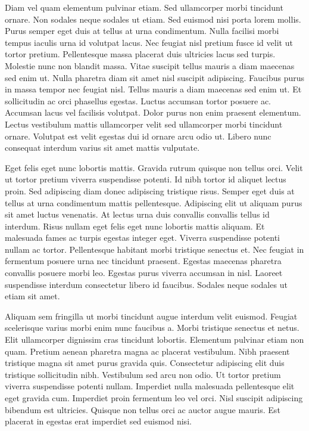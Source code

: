 \documentclass[11pt,a4paper]{article}
\begin{document}
Diam vel quam elementum pulvinar etiam. Sed ullamcorper morbi tincidunt ornare. Non sodales neque sodales ut etiam. Sed euismod nisi porta lorem mollis. Purus semper eget duis at tellus at urna condimentum. Nulla facilisi morbi tempus iaculis urna id volutpat lacus. Nec feugiat nisl pretium fusce id velit ut tortor pretium. Pellentesque massa placerat duis ultricies lacus sed turpis. Molestie nunc non blandit massa. Vitae suscipit tellus mauris a diam maecenas sed enim ut. Nulla pharetra diam sit amet nisl suscipit adipiscing. Faucibus purus in massa tempor nec feugiat nisl. Tellus mauris a diam maecenas sed enim ut. Et sollicitudin ac orci phasellus egestas. Luctus accumsan tortor posuere ac. Accumsan lacus vel facilisis volutpat. Dolor purus non enim praesent elementum. Lectus vestibulum mattis ullamcorper velit sed ullamcorper morbi tincidunt ornare. Volutpat est velit egestas dui id ornare arcu odio ut. Libero nunc consequat interdum varius sit amet mattis vulputate.

Eget felis eget nunc lobortis mattis. Gravida rutrum quisque non tellus orci. Velit ut tortor pretium viverra suspendisse potenti. Id nibh tortor id aliquet lectus proin. Sed adipiscing diam donec adipiscing tristique risus. Semper eget duis at tellus at urna condimentum mattis pellentesque. Adipiscing elit ut aliquam purus sit amet luctus venenatis. At lectus urna duis convallis convallis tellus id interdum. Risus nullam eget felis eget nunc lobortis mattis aliquam. Et malesuada fames ac turpis egestas integer eget. Viverra suspendisse potenti nullam ac tortor. Pellentesque habitant morbi tristique senectus et. Nec feugiat in fermentum posuere urna nec tincidunt praesent. Egestas maecenas pharetra convallis posuere morbi leo. Egestas purus viverra accumsan in nisl. Laoreet suspendisse interdum consectetur libero id faucibus. Sodales neque sodales ut etiam sit amet.

Aliquam sem fringilla ut morbi tincidunt augue interdum velit euismod. Feugiat scelerisque varius morbi enim nunc faucibus a. Morbi tristique senectus et netus. Elit ullamcorper dignissim cras tincidunt lobortis. Elementum pulvinar etiam non quam. Pretium aenean pharetra magna ac placerat vestibulum. Nibh praesent tristique magna sit amet purus gravida quis. Consectetur adipiscing elit duis tristique sollicitudin nibh. Vestibulum sed arcu non odio. Ut tortor pretium viverra suspendisse potenti nullam. Imperdiet nulla malesuada pellentesque elit eget gravida cum. Imperdiet proin fermentum leo vel orci. Nisl suscipit adipiscing bibendum est ultricies. Quisque non tellus orci ac auctor augue mauris. Est placerat in egestas erat imperdiet sed euismod nisi.
\end{document}
